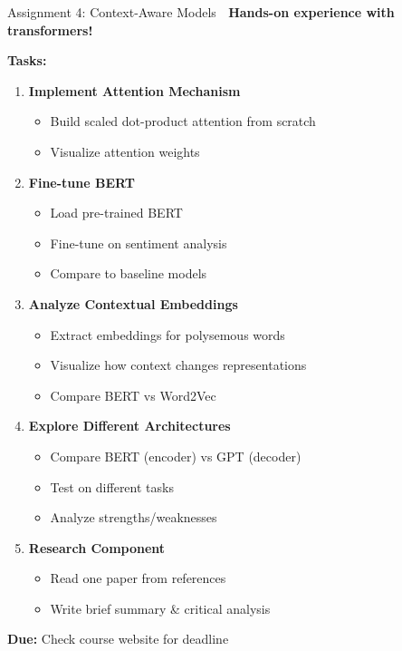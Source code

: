 \documentclass[aspectratio=169]{beamer}
\begin{document}
\begin{frame}[shrink=10]{Assignment 4: Context-Aware Models 📝}
\textbf{Hands-on experience with transformers!}

\vspace{1em}

\textbf{Tasks:}
\begin{enumerate}\setlength{\itemsep}{0pt}
    \item \textbf{Implement Attention Mechanism}
    \begin{itemize}\setlength{\itemsep}{0pt}
        \item Build scaled dot-product attention from scratch
        \item Visualize attention weights
    \end{itemize}

    \item \textbf{Fine-tune BERT}
    \begin{itemize}\setlength{\itemsep}{0pt}
        \item Load pre-trained BERT
        \item Fine-tune on sentiment analysis
        \item Compare to baseline models
    \end{itemize}

    \item \textbf{Analyze Contextual Embeddings}
    \begin{itemize}\setlength{\itemsep}{0pt}
        \item Extract embeddings for polysemous words
        \item Visualize how context changes representations
        \item Compare BERT vs Word2Vec
    \end{itemize}

    \item \textbf{Explore Different Architectures}
    \begin{itemize}\setlength{\itemsep}{0pt}
        \item Compare BERT (encoder) vs GPT (decoder)
        \item Test on different tasks
        \item Analyze strengths/weaknesses
    \end{itemize}

    \item \textbf{Research Component}
    \begin{itemize}\setlength{\itemsep}{0pt}
        \item Read one paper from references
        \item Write brief summary \& critical analysis
    \end{itemize}
\end{enumerate}

\vspace{0.5em}
\textbf{Due:} Check course website for deadline
\end{frame}
\end{document}

